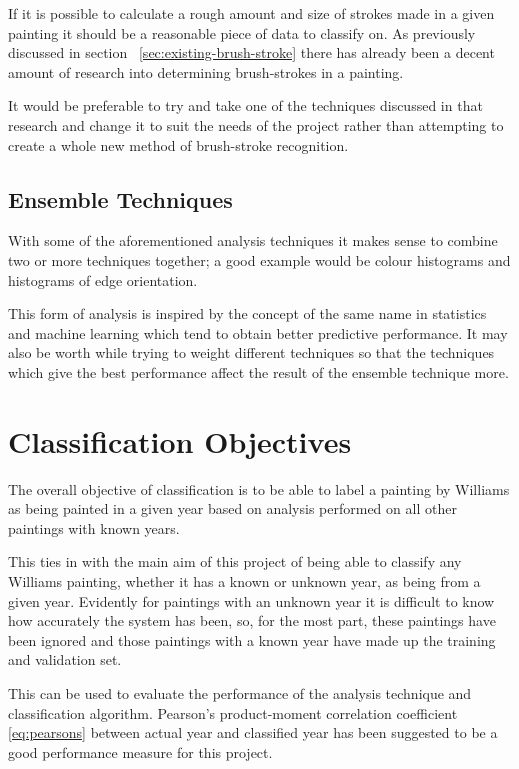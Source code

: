 If it is possible to calculate a rough amount and size of strokes made in a given painting it 
should be a reasonable piece of data to classify on. As previously discussed in section~
\ref{sec:existing-brush-stroke} there has already been a decent amount of research into determining
brush-strokes in a painting. 

It would be preferable to try and take one of the techniques discussed in that research and change
it to suit the needs of the project rather than attempting to create a whole new method of 
brush-stroke recognition.

\subsection{Ensemble Techniques}
With some of the aforementioned analysis techniques it makes sense to combine two or more 
techniques together; a good example would be colour histograms and histograms of edge orientation.

This form of analysis is inspired by the concept of the same name in statistics and machine 
learning which tend to obtain better predictive performance. It may also be worth while trying to
weight different techniques so that the techniques which give the best performance affect the 
result of the ensemble technique more.


\section{Classification Objectives}
The overall objective of classification is to be able to label a painting by Williams as 
being painted in a given year based on analysis performed on all other paintings with known years.

This ties in with the main aim of this project of being able to classify any Williams
painting, whether it has a known or unknown year, as being from a given year. Evidently for 
paintings with an unknown year it is difficult to know how accurately the system has been, so, for
the most part, these paintings have been ignored and those paintings with a known year have made
up the training and validation set.

This can be used to evaluate the performance of the analysis technique and classification 
algorithm. Pearson's product-moment correlation coefficient \eqref{eq:pearsons} between actual year
and classified year has been suggested to be a good performance measure for this project.

